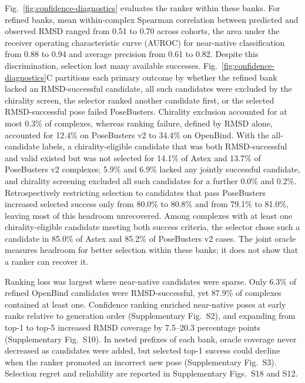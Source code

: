 \documentclass{article}
\begin{document}
Fig.~\ref{fig:confidence-diagnostics} evaluates the ranker within these banks. For refined banks, mean within-complex Spearman correlation between predicted and observed RMSD ranged from 0.51 to 0.70 across cohorts, the area under the receiver operating characteristic curve (AUROC) for near-native classification from 0.88 to 0.94 and average precision from 0.61 to 0.82. Despite this discrimination, selection lost many available successes. Fig.~\ref{fig:confidence-diagnostics}C partitions each primary outcome by whether the refined bank lacked an RMSD-successful candidate, all such candidates were excluded by the chirality screen, the selector ranked another candidate first, or the selected RMSD-successful pose failed PoseBusters. Chirality exclusion accounted for at most 0.3\% of complexes, whereas ranking failure, defined by RMSD alone, accounted for 12.4\% on PoseBusters v2 to 34.4\% on OpenBind. With the all-candidate labels, a chirality-eligible candidate that was both RMSD-successful and valid existed but was not selected for 14.1\% of Astex and 13.7\% of PoseBusters v2 complexes; 5.9\% and 6.9\% lacked any jointly successful candidate, and chirality screening excluded all such candidates for a further 0.0\% and 0.2\%. Retrospectively restricting selection to candidates that pass PoseBusters increased selected success only from 80.0\% to 80.8\% and from 79.1\% to 81.0\%, leaving most of this headroom unrecovered. Among complexes with at least one chirality-eligible candidate meeting both success criteria, the selector chose such a candidate in 85.0\% of Astex and 85.2\% of PoseBusters v2 cases. The joint oracle measures headroom for better selection within these banks; it does not show that a ranker can recover it.

Ranking loss was largest where near-native candidates were sparse. Only 6.3\% of refined OpenBind candidates were RMSD-successful, yet 87.9\% of complexes contained at least one. Confidence ranking enriched near-native poses at early ranks relative to generation order (Supplementary Fig.~S2), and expanding from top-1 to top-5 increased RMSD coverage by 7.5--20.3 percentage points (Supplementary Fig.~S10). In nested prefixes of each bank, oracle coverage never decreased as candidates were added, but selected top-1 success could decline when the ranker promoted an incorrect new pose (Supplementary Fig.~S3). Selection regret and reliability are reported in Supplementary Figs.~S18 and S12.
\end{document}
